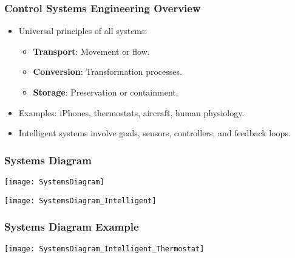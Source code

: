 \begin{frame}[fragile]\frametitle{Control Systems Engineering Overview}
      \begin{itemize}
        \item Universal principles of all systems: 
          \begin{itemize}
            \item \textbf{Transport}: Movement or flow.
            \item \textbf{Conversion}: Transformation processes.
            \item \textbf{Storage}: Preservation or containment.
          \end{itemize}
        \item Examples: iPhones, thermostats, aircraft, human physiology.
        \item Intelligent systems involve goals, sensors, controllers, and feedback loops.
      \end{itemize}
\end{frame}

\begin{frame}[fragile]\frametitle{Systems Diagram}

\begin{center}
\texttt{[image: SystemsDiagram]}

\texttt{[image: SystemsDiagram\_Intelligent]}

\end{center}	  
\end{frame}

\begin{frame}[fragile]\frametitle{Systems Diagram Example}

\begin{center}
\texttt{[image: SystemsDiagram\_Intelligent\_Thermostat]}

\end{center}	  
\end{frame}


